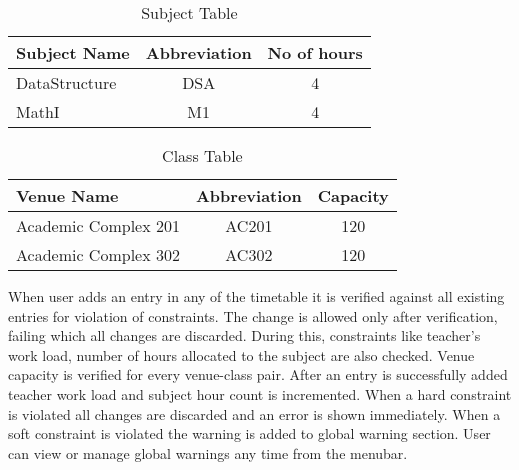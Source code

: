 \begin{table}[h!]
\centering
\begin{tabular}{|l|c|c|}

\hline
Subject Name & Abbreviation & No of hours\\
\hline
DataStructure & DSA & 4\\
\hline
MathI & M1 & 4\\
\hline 
\end{tabular}
\caption{Subject Table}
\label{tab:template}
\end{table}


\begin{table}[h!]
\centering
\begin{tabular}{|l|c|c|}

\hline
 Venue Name & Abbreviation & Capacity\\
\hline
Academic Complex 201 & AC201 & 120\\
 \hline
Academic Complex 302 & AC302 & 120\\
\hline 
\end{tabular}
\caption{Class Table}
\label{tab:template}
\end{table}






When user adds an entry in any of the timetable it is verified against all existing entries for violation of constraints. The change is allowed only after verification, failing which all changes are discarded. During this, constraints like teacher's work load, number of hours allocated to the subject are also checked. Venue capacity is verified for every venue-class pair. After an entry is successfully added teacher work load and subject hour count is incremented. When a hard constraint is violated all changes are discarded and an error is shown immediately. When a soft constraint is violated the warning is added to global warning section. User can view or manage global warnings any time from the menubar.



